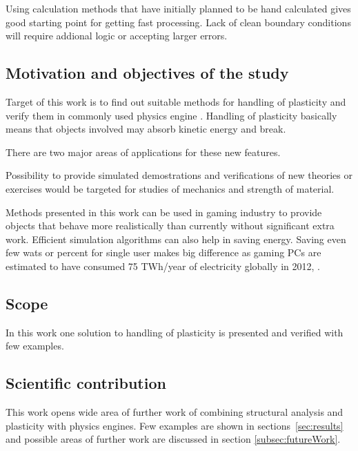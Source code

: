 Using calculation methods that have initially planned to be hand calculated gives good starting point for 
getting fast processing. Lack of clean boundary conditions will require addional logic or accepting larger errors.


\subsection{Motivation and objectives of the study}

Target of this work is to find out suitable methods for handling of plasticity and verify them 
in commonly used physics engine \bullet. 
Handling of plasticity basically means that objects involved may absorb kinetic energy and break. 

There are two major areas of applications for these new features.

Possibility to provide simulated demostrations and verifications of new theories or exercises  would be targeted for 
studies of mechanics and strength of material. 
 
Methods presented in this work can be used in gaming industry to provide objects that behave more realistically than currently without significant extra work. Efficient simulation algorithms can also help in saving energy. Saving even few wats or percent for single user makes big difference as gaming PCs are estimated to have consumed 75 TWh/year of electricity globally in 2012, \cite{gaming.energy}.

\subsection{Scope}

In this work one solution to handling of plasticity is presented and verified with few examples.

\subsection{Scientific contribution}

This work opens wide area of further work of combining structural analysis and plasticity with physics engines.
Few examples are shown in sections~\ref{sec:results} and possible areas of further work are discussed in section \ref{subsec:futureWork}.

\cleardoublepage
